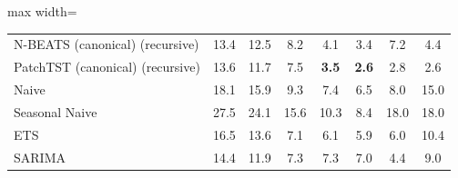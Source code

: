 \begin{table}[htbp]
\begin{adjustbox}{max width=\textwidth}
\begin{tabular}{lccccccc}
N-BEATS (canonical) (recursive) & 13.4 & 12.5 & 8.2 & 4.1 & 3.4 & 7.2 & 4.4 \\
PatchTST (canonical) (recursive) & 13.6 & 11.7 & 7.5 & \textbf{3.5} & \textbf{2.6} & 2.8 & 2.6 \\
\addlinespace
Naive & 18.1 & 15.9 & 9.3 & 7.4 & 6.5 & 8.0 & 15.0 \\
Seasonal Naive & 27.5 & 24.1 & 15.6 & 10.3 & 8.4 & 18.0 & 18.0 \\
ETS & 16.5 & 13.6 & 7.1 & 6.1 & 5.9 & 6.0 & 10.4 \\
SARIMA & 14.4 & 11.9 & 7.3 & 7.3 & 7.0 & 4.4 & 9.0 \\
\bottomrule
\end{tabular}
\end{adjustbox}
\end{table}
